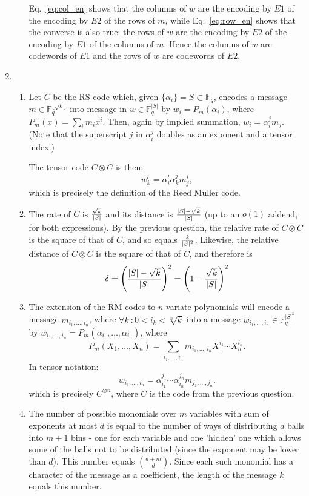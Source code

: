 \documentclass[11pt]{article} \usepackage{amssymb}
\begin{document}
\begin{enumerate}
\begin{enumerate}
Eq.~\ref{eq:col_en} shows that the columns of $w$ are the encoding by $E1$
of the encoding by $E2$ of the rows of $m$, while 
Eq.~\ref{eq:row_en} shows that the converse is also true: the rows of $w$
are the encoding by $E2$ of the encoding by $E1$ of the columns of $m$. 
Hence the columns of $w$ are codewords of $E1$ and the rows of $w$ 
are codewords of $E2$. 
\end{enumerate}
\item
\begin{enumerate}
\item
Let $C$ be the RS code which, given $\{\alpha_i\}=S\subset \mathbb{F}_q$, encodes a message  
$m\in \mathbb{F}_q^{\lfloor\sqrt{k}\rfloor}$ into message in $w\in \mathbb{F}_q^{|S|}$ by $w_{i}=P_m(\alpha_i)$, where 
$P_m(x)=\sum_im_ix^i$. Then, again by implied summation, $w_i=\alpha_i^jm_j$. (Note that
the superscript $j$ in $\alpha_i^j$ doubles as an exponent and a
tensor index.)

The tensor code $C\otimes C$ is then:
\begin{equation*}
  w_k^l=\alpha_i^l\alpha_k^jm_j^i,
\end{equation*}
which is precisely the definition of the Reed Muller code.
\item
The rate of $C$ is ${\sqrt{k}\over |S|}$  and its distance is 
${|S|-\sqrt{k} \over |S|}$ (up to an $o(1)$ addend, for both expressions). By the previous question,
the relative rate of $C\otimes C$ is the square of that of $C$, and so equals
${k\over |S|^2}$. Likewise, the relative distance of $C\otimes C$ is the square
of that of $C$, and therefore is
\begin{equation*}
  \delta=\left({|S|-\sqrt{k} \over |S|}\right)^2
        =\left(1-{\sqrt{k} \over |S|}\right)^2
\end{equation*}
\item
The extension of the RM codes to $n$-variate polynomials will encode
a message $m_{i_1,\ldots,i_n}$, where $\forall k\:: 0<i_k<\sqrt[n]{k}$ into a message
 $w_{i_1,\ldots,i_n}\in \mathbb{F}_q^{|S|^n}$ by $w_{i_1,\ldots,i_n}=P_m(\alpha_{i_1},\ldots,\alpha_{i_n})$, where
 \begin{equation*}
P_m(X_1,\ldots,X_n)=\sum_{i_1,\ldots,i_n}m_{i_1,\ldots,i_n}X_1^{i_1}\cdots X_n^{i_n}.
 \end{equation*}
In tensor notation:
\begin{equation*}
  w_{i_1,\ldots,i_n}=\alpha_{i_1}^{j_1}\cdots\alpha_{i_n}^{j_n}m_{j_1,\ldots,j_n}.  
\end{equation*}
which is precisely $C^{\otimes n}$, where $C$ is the code from the
previous question.
\item
The number of possible monomials over $m$ variables with sum of exponents  at
most $d$ is equal to the number of ways of distributing $d$ balls 
into $m + 1$ bins - one for each variable and one 'hidden' one which 
allows some of the balls not to be distributed (since the exponent may be
lower than $d$). This number equals ${d+m\choose d}$. Since each such monomial has
a character of the message as a coefficient, the length of the message
$k$ equals this number.



\end{enumerate}
\end{enumerate}
\end{document}
